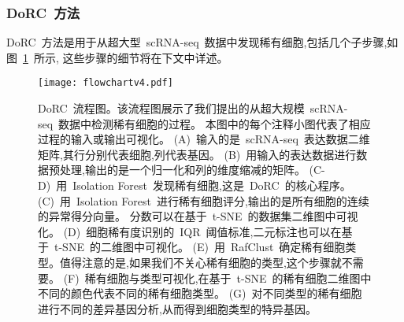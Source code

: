 \subsubsection{DoRC~方法}
DoRC~方法是用于从超大型~scRNA-seq~数据中发现稀有细胞,包括几个子步骤,如图~\ref{fig:flowchart}~所示, 这些步骤的细节将在下文中详述。
\begin{figure}[!htbp]
    \centering
    \texttt{[image: flowchartv4.pdf]}
    \caption{DoRC~流程图。该流程图展示了我们提出的从超大规模~scRNA-seq~数据中检测稀有细胞的过程。
    本图中的每个注释小图代表了相应过程的输入或输出可视化。
    (A)~输入的是~scRNA-seq~表达数据二维矩阵,其行分别代表细胞,列代表基因。
    (B)~用输入的表达数据进行数据预处理,输出的是一个归一化和列的维度缩减的矩阵。
    (C-D)~用~Isolation Forest~发现稀有细胞,这是~DoRC~的核心程序。
    (C)~用~Isolation Forest~进行稀有细胞评分,输出的是所有细胞的连续的异常得分向量。
    分数可以在基于~t-SNE~的数据集二维图中可视化。
    (D)~细胞稀有度识别的~IQR~阈值标准,二元标注也可以在基于~t-SNE~的二维图中可视化。
    (E)~用~RafClust~确定稀有细胞类型。值得注意的是,如果我们不关心稀有细胞的类型,这个步骤就不需要。
    (F)~稀有细胞与类型可视化,在基于~t-SNE~的稀有细胞二维图中不同的颜色代表不同的稀有细胞类型。
    (G)~对不同类型的稀有细胞进行不同的差异基因分析,从而得到细胞类型的特异基因。
    }
    \label{fig:flowchart}
\end{figure}

